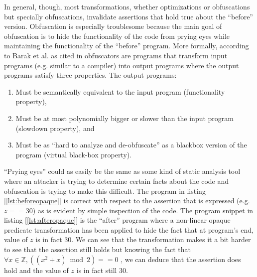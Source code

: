 \documentclass[compsoc,conference,a4paper,10pt,times]{IEEEtran}
\begin{document}
In general, though, most transformations, whether optimizations or obfuscations but specially obfuscations, invalidate assertions that hold true about the ``before'' version. Obfuscation is especially troublesome because the main goal of obfuscation is to hide the functionality of the code from prying eyes while maintaining the functionality of the ``before'' program. More formally, according to Barak et al. as cited in \cite{BanescuCGNP16} obfuscators are programs that transform input programs (e.g. similar to a compiler) into output programs where the output programs satisfy three properties. The output programs:
\begin{enumerate}
   \item Must be semantically equivalent to the input program (functionality property),
   \item Must be at most polynomially bigger or slower than the input program (slowdown property), and
   \item Must be as ``hard to analyze and de-obfuscate'' as a blackbox version of the program (virtual black-box property).
\end{enumerate}
``Prying eyes'' could as easily be the same as some kind of static analysis tool where an attacker is trying to determine certain facts about the code and obfuscation is trying to make this difficult. The program in listing [\ref{lst:beforeopaque}] is correct with respect to the assertion that is expressed (e.g. $z == 30$) as is evident by simple inspection of the code. The program snippet in listing [\ref{lst:afteropaque}] is the ``after'' program where a non-linear opaque predicate transformation has been applied to hide the fact that at program's end, value of $z$ is in fact 30. We can see that the transformation makes it a bit harder to see that the assertion still holds but knowing the fact that $\forall x \in \mathbb{Z}, ((x^2 + x)\bmod 2) == 0$ , we can deduce that the assertion does hold and the value of $z$ is in fact still 30. 
\end{document}
